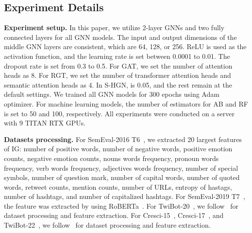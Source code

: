 \documentclass[10pt,twocolumn,letterpaper]{article}
\begin{document}
\subsection{Experiment Details}
\label{sec:ComputationDetails}
\noindent
\textbf{Experiment setup.}
In this paper, we utilize 2-layer GNNs and two fully connected layers for all GNN models. The input and output dimensions of the middle GNN layers are consistent, which are 64, 128, or 256. ReLU is used as the activation function, and the learning rate is set between 0.0001 to 0.01. The dropout rate is set from 0.3 to 0.5. For GAT, we set the number of attention heads as 8. For RGT, we set the number of transformer attention heads and semantic attention heads as 4. In S-HGN,  is 0.05, and the rest remain at the default settings. We trained all GNN models for 300 epochs using Adam optimizer. For machine learning models, the number of estimators for AB and RF is set to 50 and 100, respectively. All experiments were conducted on a server with 9 TITAN RTX GPUs.

\noindent
\textbf{Datasets processing.}
For SemEval-2016 T6~\cite{Alpher21}, we extracted 20 largest features of IG: number of positive words, number of negative words, positive emotion counts, negative emotion counts, nouns words frequency, pronoun words frequency, verb words frequency, adjectives words frequency, number of special symbols, number of question mark, number of capital words, number of quoted words, retweet counts, mention counts, number of URLs, entropy of hastags, number of hashtags, and number of capitalized hashtags. For SemEval-2019 T7~\cite{Alpher25}, the feature was extracted by using RoBERTa~\cite{Alpher62}. For TwiBot-20~\cite{Alpher11}, we follow~\cite{Alpher06} for dataset processing and feature extraction. For Cresci-15~\cite{Alpher10}, Cresci-17~\cite{Alpher04}, and TwiBot-22~\cite{Alpher12}, we follow~\cite{Alpher12} for dataset processing and feature extraction.
\end{document}
